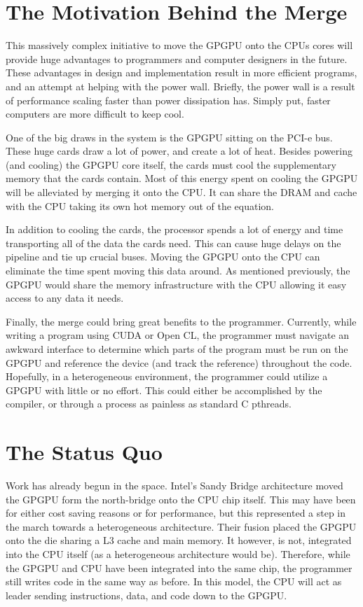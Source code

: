 \section*{The Motivation Behind the Merge}

This massively complex initiative to move the GPGPU onto the CPUs cores will provide huge advantages to programmers and computer designers in the future. These advantages in design and implementation result in more efficient programs, and an attempt at helping with the power wall. Briefly, the power wall is a result of performance scaling faster than power dissipation has. Simply put, faster computers are more difficult to keep cool.  

One of the big draws in the system is the GPGPU sitting on the PCI-e bus. These huge cards draw a lot of power, and create a lot of heat. Besides powering (and cooling) the GPGPU core itself, the cards must cool the supplementary memory that the cards contain. Most of this energy spent on cooling the GPGPU will be alleviated by merging it onto the CPU. It can share the DRAM and cache with the CPU taking its own hot memory out of the equation. 

In addition to cooling the cards, the processor spends a lot of energy and time transporting all of the data the cards need. This can cause huge delays on the pipeline and tie up crucial buses. Moving the GPGPU onto the CPU can eliminate the time spent moving this data around. As mentioned previously, the GPGPU would share the memory infrastructure with the CPU allowing it easy access to any data it needs. 

Finally, the merge could bring great benefits to the programmer. Currently, while writing a program using CUDA or Open CL, the programmer must navigate an awkward interface to determine which parts of the program must be run on the GPGPU and reference the device (and track the reference) throughout the code. Hopefully, in a heterogeneous environment, the programmer could utilize a GPGPU with little or no effort. This could either be accomplished by the compiler, or through a process as painless as standard C pthreads. 

\section*{The Status Quo}

Work has already begun in the space. Intel's Sandy Bridge architecture moved the GPGPU form the north-bridge onto the CPU chip itself. This may have been for either cost saving reasons or for performance, but this represented a step in the march towards a heterogeneous architecture. Their fusion placed the GPGPU onto the die sharing a L3 cache and main memory. It however, is not, integrated into the CPU itself (as a heterogeneous architecture would be). Therefore, while the GPGPU and CPU have been integrated into the same chip, the programmer still writes code in the same way as before. In this model, the CPU will act as leader sending instructions, data, and code down to the GPGPU. 

